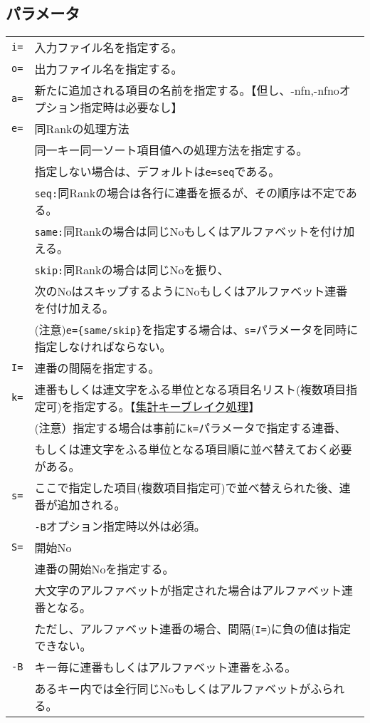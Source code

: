 \subsection*{パラメータ}
\begin{table}[htbp]
{\small
\begin{tabular}{ll}
\verb|i=|    & 入力ファイル名を指定する。\\
\verb|o=|    & 出力ファイル名を指定する。\\
\verb|a=|    & 新たに追加される項目の名前を指定する。【但し、-nfn,-nfnoオプション指定時は必要なし】\\
\verb|e=|    & 同Rankの処理方法 \\
             & 同一キー同一ソート項目値への処理方法を指定する。\\
             & 指定しない場合は、デフォルトは\verb|e=seq|である。\\
             & \verb|seq:|同Rankの場合は各行に連番を振るが、その順序は不定である。\\
             & \verb|same:|同Rankの場合は同じNoもしくはアルファベットを付け加える。\\
             & \verb|skip:|同Rankの場合は同じNoを振り、\\
             & 次のNoはスキップするようにNoもしくはアルファベット連番を付け加える。\\
             & (注意)\verb|e={same/skip}|を指定する場合は、\verb|s=|パラメータを同時に指定しなければならない。\\
\verb|I=|    & 連番の間隔を指定する。 \\
\verb|k=|    & 連番もしくは連文字をふる単位となる項目名リスト(複数項目指定可)を指定する。【\hyperref[sect:option_k]{集計キーブレイク処理}】\\
             & (注意）指定する場合は事前に\verb|k=|パラメータで指定する連番、\\
             & もしくは連文字をふる単位となる項目順に並べ替えておく必要がある。\\
\verb|s=|    & ここで指定した項目(複数項目指定可)で並べ替えられた後、連番が追加される。\\
             & \verb|-B|オプション指定時以外は必須。\\
\verb|S=|    & 開始No \\
             & 連番の開始Noを指定する。 \\
             & 大文字のアルファベットが指定された場合はアルファベット連番となる。\\
             & ただし、アルファベット連番の場合、間隔(\verb|I=|)に負の値は指定できない。 \\
 \verb|-B|   & キー毎に連番もしくはアルファベット連番をふる。 \\
             & あるキー内では全行同じNoもしくはアルファベットがふられる。 \\
\end{tabular} 
}
\end{table} 


